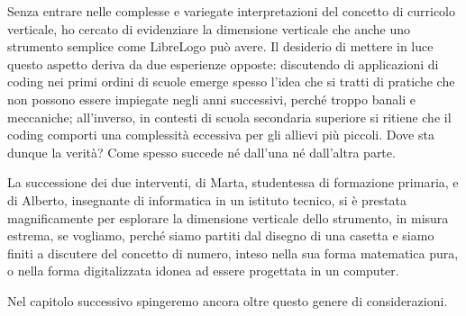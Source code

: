 Senza entrare nelle complesse e variegate interpretazioni del concetto di curricolo verticale, ho cercato di evidenziare la dimensione verticale che anche uno strumento semplice come LibreLogo può avere. Il desiderio di mettere in luce questo aspetto deriva da due esperienze opposte: discutendo di applicazioni di coding nei primi ordini di scuole emerge spesso l'idea che si tratti di pratiche che non possono essere impiegate negli anni successivi, perché troppo banali e meccaniche; all'inverso, in contesti di scuola secondaria superiore si ritiene che il coding comporti una complessità eccessiva per gli allievi più piccoli. Dove sta dunque la verità? Come spesso succede né dall'una né dall'altra parte.

La successione dei due interventi, di Marta, studentessa di formazione primaria, e di Alberto, insegnante di informatica in un istituto tecnico, si è prestata magnificamente per esplorare la dimensione verticale dello strumento, in misura estrema, se vogliamo, perché siamo partiti dal disegno di una casetta e siamo finiti a discutere del concetto di numero, inteso nella sua forma matematica pura, o nella forma digitalizzata idonea ad essere progettata in un computer.

Nel capitolo successivo spingeremo ancora oltre questo genere di considerazioni. 

                                                                                                                                                                                                   
  




























